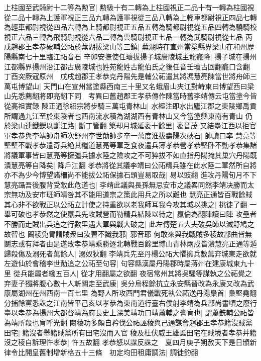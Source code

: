 上柱國至武騎尉十二等為勲官|{
	勲級十有二轉為上柱國視正二品十有一轉為柱國視從二品十轉為上護軍視正三品九轉為護軍視從三品八轉為上輕車都尉視正四品七轉為輕車都尉視從四品六轉為上騎都尉視正五品五轉為騎都尉視從五品四轉為驍騎校視正六品三轉為飛騎尉視從六品二轉為雲騎尉視正七品一轉為武騎尉視從七品}
丙戌趙郡王孝恭破輔公祏於蕪湖拔梁山等三鎮|{
	蕪湖時在宣州當塗縣界梁山在和州歷陽縣南七十里臨江祏音石}
辛卯安撫使任瓌拔揚子城廣陵城主龍龕降|{
	揚子城在揚州江都縣界揚州治江都古廣陵城也姓苑龍姓古龍伯氏之後任音壬瓌古回翻龕口含翻}
丁酉突厥寇原州　戊戌趙郡王孝恭克丹陽先是輔公祏遣其將馮慧亮陳當世將舟師三萬屯博望山|{
	天門山在宣州當塗縣西南三十里又名蛾眉山夾江對峙東曰博望西曰梁山先悉薦翻將即亮翻下同　考異曰舊趙郡王孝恭傳作陳當時舊李靖傳云屯當塗今皆從高祖實録}
陳正通徐紹宗將步騎三萬屯青林山|{
	水經注即水出廬江郡之東陵鄉禹貢所謂過九江至於東陵者也西南流水積為湖湖西有青林山又今當塗縣東南有青山}
仍於梁山連鐵鏁以斷江路|{
	斷丁管翻}
築却月城延袤十餘里|{
	袤音茂}
又結壘江西以拒官軍孝恭與李靖帥舟師次舒州李世勣帥步卒一萬度淮拔夀陽次硤石|{
	帥讀曰率}
慧亮等堅壁不戰孝恭遣奇兵絶其糧道慧亮等軍乏食夜遣兵薄孝恭營孝恭堅卧不動孝恭集諸將議軍事皆曰慧亮等擁彊兵據水陸之險攻之不可猝拔不如直指丹陽掩其巢穴丹陽既潰慧亮等自降矣|{
	降戶江翻}
孝恭將從其議李靖曰公祏精兵雖在此水陸二軍然所自將亦不為少今博望諸柵尚不能拔公祏保據石頭豈易取哉|{
	易以豉翻}
進攻丹陽旬月不下慧亮躡吾後腹背受敵此危道也|{
	李靖此議與長孫無忌安市之議畧同然李靖决勝而太宗無功及安市班師靖咎其不能用道宗之策此用兵之所以難也}
慧亮正通皆百戰餘賊其心非不欲戰正以公祏立計使之持重欲以老我師耳我今攻其城以挑之|{
	挑徒了翻}
一舉可破也孝恭然之使羸兵先攻賊營而勒精兵結陳以待之|{
	羸倫為翻陳讀曰陣}
攻壘者不勝而走賊出兵追之行數里遇大軍與戰大破之|{
	此左傳楚五大夫破吳師以滅舒鳩之故智也}
闞稜免胄謂賊衆曰汝曹不識我邪|{
	邪音耶}
何敢來與我戰賊多稜故部曲皆無鬭志或有拜者由是遂敗孝恭靖乘勝逐北轉戰百餘里博山青林兩戍皆潰慧亮正通等遁歸殺傷及溺死者萬餘人|{
	溺奴狄翻}
李靖兵先至丹楊公祏大懼擁兵數萬弃城東走欲就左遊仙於會稽李世勣追之公祏至句容|{
	句容縣漢屬丹陽郡時屬蔣州在建康城東九十里}
從兵能屬者纔五百人|{
	從才用翻屬之欲翻}
夜宿常州其將吳騷等謀執之公祏覺之弃妻子獨將腹心數十人斬關走至武康|{
	吳分烏程餘抗立永安縣晉改為永康又改為武康屬湖州在州西南一百七里}
為野人所攻西門君儀戰死執公祏送丹陽梟首|{
	梟堅堯翻}
分捕餘黨悉誅之江南皆平己亥以孝恭為東南道行臺右僕射李靖為兵部尚書頃之廢行臺以孝恭為揚州大都督靖為府長史上深美靖功曰靖蕭輔之膏肓也|{
	謂蕭銑輔公祏皆為靖所殺也肓呼光翻}
闞稜功多頗自矜伐公祏誣稜與己通謀會趙郡王孝恭籍沒賊黨田宅|{
	籍沒者舉籍賊黨所有田宅沒而入官}
稜及杜伏威王雄誕田宅在賊境者孝恭并籍沒之稜自訴理忤孝恭|{
	忤五故翻}
孝恭怒以謀反誅之　夏四月庚子朔赦天下是日頒新律令比開皇舊制增新格五十三條　初定均田租庸調法|{
	調徒釣翻}
